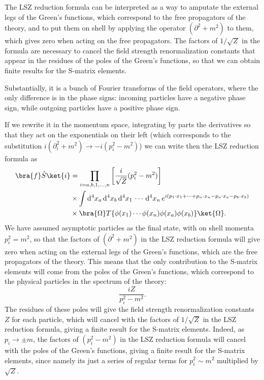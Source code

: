 The LSZ reduction formula can be interpreted as a way to amputate the external legs of the Green's functions, which correspond to the free propagators of the theory, and to put them on shell by applying the operator \((\partial^2 + m^2)\) to them, which gives zero when acting on the free propagators. The factors of \(1/\sqrt{Z}\) in the formula are necessary to cancel the field strength renormalization constants that appear in the residues of the poles of the Green's functions, so that we can obtain finite results for the S-matrix elements.

Substantially, it is a bunch of Fourier transforms of the field operators, where the only difference is in the phase signs: incoming particles have a negative phase sign, while outgoing particles have a positive phase sign.

If we rewrite it in the momentum space, integrating by parts the derivatives so that they act on the exponentials on their left (which corresponds to the substitution \(i(\partial_i^2 + m^2) \to -i (p_i^2 - m^2)\)) we can write then the LSZ reduction formula as
\begin{equation}
    \begin{aligned}
        \bra{f} \hat{S} \ket{i} & = \prod_{i = a,b,1,\dots,n} \left[ \frac{i}{\sqrt{Z}} (p_i^2 - m^2) \right]                                                                                                        \\
                                & \times \int \mathrm{d}^4 x_a\, \mathrm{d}^4 x_b\, \mathrm{d}^4 x_1 \, \cdots \, \mathrm{d}^4 x_n \, e^{i (p_1 \cdot x_1 + \cdots + p_n \cdot x_n - p_a \cdot x_a - p_b \cdot x_b)} \\
                                & \times \bra{\Omega} T\{\phi(x_1)\cdots\phi(x_n)\phi(x_a)\phi(x_b)\}\ket{\Omega}.
    \end{aligned}
    \label{eq:LSZ_reduction_formula_momentum_space}
\end{equation}
We have assumed asymptotic particles as the final state, with on shell momenta \(p_i^2 = m^2\), so that the factors of \((\partial^2 + m^2)\) in the LSZ reduction formula will give zero when acting on the external legs of the Green's functions, which are the free propagators of the theory. This means that the only contribution to the S-matrix elements will come from the poles of the Green's functions, which correspond to the physical particles in the spectrum of the theory:
\[
    \frac{iZ}{p_i^2 -m^2}.
\]
The residues of these poles will give the field strength renormalization constants \(Z\) for each particle, which will cancel with the factors of \(1/\sqrt{Z}\) in the LSZ reduction formula, giving a finite result for the S-matrix elements. Indeed, as \(p_i \to \pm m\), the factors of \((p_i^2 - m^2)\) in the LSZ reduction formula will cancel with the poles of the Green's functions, giving a finite result for the S-matrix elements, since namely its just a series of regular terms for \(p_i^2 \sim m^2\) multiplied by \(\sqrt{Z} \).

